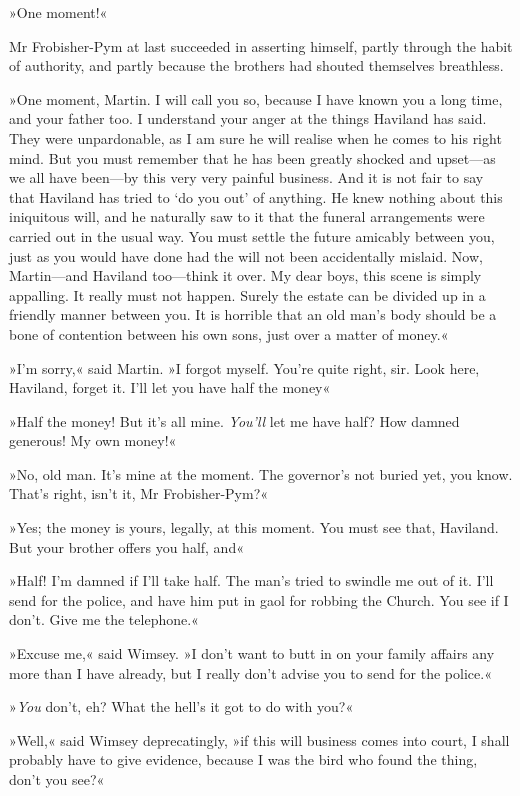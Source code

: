 »One moment!«

Mr Frobisher-Pym at last succeeded in asserting himself, partly through the habit of authority, and partly because the brothers had shouted themselves breathless.

»One moment, Martin. I will call you so, because I have known you a long time, and your father too. I understand your anger at the things Haviland has said. They were unpardonable, as I am sure he will realise when he comes to his right mind. But you must remember that he has been greatly shocked and upset—as we all have been—by this very very painful business. And it is not fair to say that Haviland has tried to `do you out' of anything. He knew nothing about this iniquitous will, and he naturally saw to it that the funeral arrangements were carried out in the usual way. You must settle the future amicably between you, just as you would have done had the will not been accidentally mislaid. Now, Martin—and Haviland too—think it over. My dear boys, this scene is simply appalling. It really must not happen. Surely the estate can be divided up in a friendly manner between you. It is horrible that an old man's body should be a bone of contention between his own sons, just over a matter of money.«

»I'm sorry,« said Martin. »I forgot myself. You're quite right, sir. Look here, Haviland, forget it. I'll let you have half the money\longdash«

»Half the money! But it's all mine. \textit{You'll} let me have half? How damned generous! My own money!«

»No, old man. It's mine at the moment. The governor's not buried yet, you know. That's right, isn't it, Mr Frobisher-Pym?«

»Yes; the money is yours, legally, at this moment. You must see that, Haviland. But your brother offers you half, and\longdash«

»Half! I'm damned if I'll take half. The man's tried to swindle me out of it. I'll send for the police, and have him put in gaol for robbing the Church. You see if I don't. Give me the telephone.«

»Excuse me,« said Wimsey. »I don't want to butt in on your family affairs any more than I have already, but I really don't advise you to send for the police.«

»\textit{You} don't, eh? What the hell's it got to do with you?«

»Well,« said Wimsey deprecatingly, »if this will business comes into court, I shall probably have to give evidence, because I was the bird who found the thing, don't you see?«


